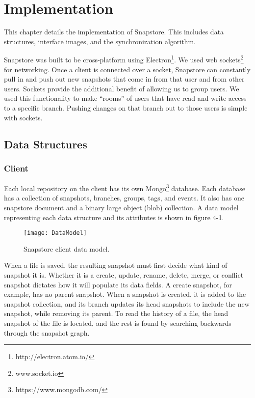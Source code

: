 \chapter{Implementation}

This chapter details the implementation of Snapstore. This includes data structures, interface images, and the synchronization algorithm. 

Snapstore was built to be cross-platform using Electron\footnote{http://electron.atom.io/}. We used web sockets\footnote{www.socket.io} for networking. Once a client is connected over a socket, Snapstore can constantly pull in and push out new snapshots that come in from that user and from other users. Sockets provide the additional benefit of allowing us to group users. We used this functionality to make ``rooms'' of users that have read and write access to a specific branch. Pushing changes on that branch out to those users is simple with sockets.

\section{Data Structures}

\subsection{Client}

Each local repository on the client has its own Mongo\footnote{https://www.mongodb.com/} database. Each database has a collection of snapshots, branches, groups, tags, and events. It also has one snapstore document and a binary large object (blob) collection. A data model representing each data structure and its attributes is shown in figure 4-1.

\begin{figure}
\texttt{[image: DataModel]}
\caption{Snapstore client data model.}
\label{arm:fig1}
\end{figure}

When a file is saved, the resulting snapshot must first decide what kind of snapshot it is. Whether it is a create, update, rename, delete, merge, or conflict snapshot dictates how it will populate its data fields. A create snapshot, for example, has no parent snapshot. When a snapshot is created, it is added to the snapshot collection, and its branch updates its head snapshots to include the new snapshot, while removing its parent. To read the history of a file, the head snapshot of the file is located, and the rest is found by searching backwards through the snapshot graph.

